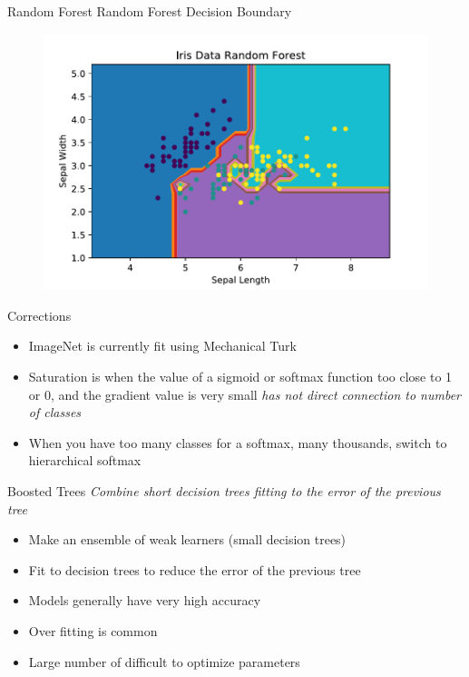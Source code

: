 \documentclass[10pt]{beamer}
\begin{document}
\begin{frame}{Random Forest}
Random Forest Decision Boundary
		\begin{figure}	
			\includegraphics[width=1.0\textwidth, center, trim=0cm 0cm 0 0cm]{images/Iris_Data_RF.pdf}
	\end{figure}
\end{frame}

\begin{frame}{Corrections}
	\begin{itemize}
		\item ImageNet is currently fit using Mechanical Turk
		\item Saturation is when the value of a sigmoid or softmax function too close to 1 or 0, and the gradient value is very small \emph{has not direct connection to number of classes}
		\item When you have too many classes for a softmax, many thousands, switch to hierarchical softmax
	\end{itemize}
\end{frame}

\begin{frame}{Boosted Trees}
\emph{Combine short decision trees fitting to the error of the previous tree}
	\begin{itemize}
		\item Make an ensemble of weak learners (small decision trees)
		\item Fit to decision trees to reduce the error of the previous tree
		\item Models generally have very high accuracy
		\item Over fitting is common
		\item Large number of difficult to optimize parameters
	\end{itemize}
\end{frame}
\end{document}
